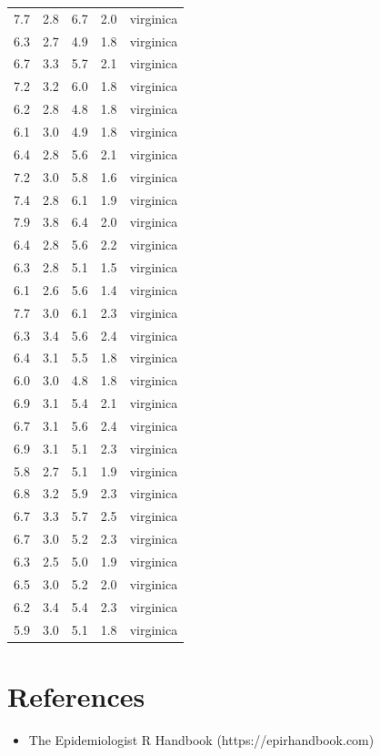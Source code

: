 \documentclass[
  letterpaper,
  DIV=11,
  numbers=noendperiod,
  oneside]{scrreprt}
\providecommand{\tightlist}{%
  \setlength{\itemsep}{0pt}\setlength{\parskip}{0pt}}\usepackage{longtable,booktabs,array}
\begin{document}
\begin{longtable}[]{@{}rrrrl@{}}
7.7 & 2.8 & 6.7 & 2.0 & virginica \\
6.3 & 2.7 & 4.9 & 1.8 & virginica \\
6.7 & 3.3 & 5.7 & 2.1 & virginica \\
7.2 & 3.2 & 6.0 & 1.8 & virginica \\
6.2 & 2.8 & 4.8 & 1.8 & virginica \\
6.1 & 3.0 & 4.9 & 1.8 & virginica \\
6.4 & 2.8 & 5.6 & 2.1 & virginica \\
7.2 & 3.0 & 5.8 & 1.6 & virginica \\
7.4 & 2.8 & 6.1 & 1.9 & virginica \\
7.9 & 3.8 & 6.4 & 2.0 & virginica \\
6.4 & 2.8 & 5.6 & 2.2 & virginica \\
6.3 & 2.8 & 5.1 & 1.5 & virginica \\
6.1 & 2.6 & 5.6 & 1.4 & virginica \\
7.7 & 3.0 & 6.1 & 2.3 & virginica \\
6.3 & 3.4 & 5.6 & 2.4 & virginica \\
6.4 & 3.1 & 5.5 & 1.8 & virginica \\
6.0 & 3.0 & 4.8 & 1.8 & virginica \\
6.9 & 3.1 & 5.4 & 2.1 & virginica \\
6.7 & 3.1 & 5.6 & 2.4 & virginica \\
6.9 & 3.1 & 5.1 & 2.3 & virginica \\
5.8 & 2.7 & 5.1 & 1.9 & virginica \\
6.8 & 3.2 & 5.9 & 2.3 & virginica \\
6.7 & 3.3 & 5.7 & 2.5 & virginica \\
6.7 & 3.0 & 5.2 & 2.3 & virginica \\
6.3 & 2.5 & 5.0 & 1.9 & virginica \\
6.5 & 3.0 & 5.2 & 2.0 & virginica \\
6.2 & 3.4 & 5.4 & 2.3 & virginica \\
5.9 & 3.0 & 5.1 & 1.8 & virginica \\
\end{longtable}

\hypertarget{references-1}{%
\section{References}\label{references-1}}

\begin{itemize}
\tightlist
\item
  The Epidemiologist R Handbook (https://epirhandbook.com)
\end{itemize}
\end{document}
